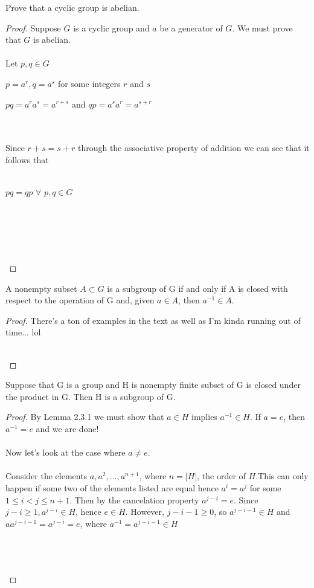 \documentclass[12pt]{article}
\newenvironment{lemma}[2][Lemma]{\begin{trivlist}
\item[\hskip \labelsep {\bfseries #1}\hskip \labelsep {\bfseries #2.}]}{\end{trivlist}}
\newenvironment{problem}[2][Problem]{\begin{trivlist}
\item[\hskip \labelsep {\bfseries #1}\hskip \labelsep {\bfseries #2.}]}{\end{trivlist}}
\begin{document}
\begin{problem}{2.3.12}
Prove that a cyclic group is abelian.
\end{problem}

\begin{proof}
Suppose $G$ is a cyclic group and $a$ be a generator of $G$. We must prove that $G$ is abelian. \\ \\
Let $p,q \in G$
\centerline{$p=a^r,q=a^s$ for some integers $r$ and $s$}
\centerline{$pq=a^ra^s=a^{r+s}$ and $qp=a^sa^r=a^{s+r}$} \\ \\
Since $r+s=s+r$ through the associative property of addition we can see that it follows that \\ \\ 
\centerline{$pq=qp$ $\forall$ $p,q \in G$} \\ \\
\centerline{} \\ \\
\end{proof}
 
 \begin{lemma}{2.3.1}
A nonempty subset $A \subset G$ is a subgroup of G if and only if A is closed with respect to the operation of G and, given $a \in A$, then $a^{-1} \in A$. 
\end{lemma}

\begin{proof}
There's a ton of examples in the text as well as I'm kinda running out of time... lol
\\ \\
\centerline{} 
\bigskip
\end{proof}

\begin{lemma}{2.3.2}
Suppose that G is a group and H is nonempty finite subset of G is closed under the product in G. Then H is a subgroup of G.
\end{lemma}

\begin{proof}
By Lemma 2.3.1 we must show that $a \in H$ implies $a^{-1}\in H$. If $a = e$, then $a^{-1} = e$ and we are done! \\ \\
Now let's look at the case where $a \neq e$. \\ \\
Consider the elements $a,a^2,...,a^{n+1}$, where $n = |H|$, the order of $H$.This can only happen if some two of the elements listed are equal hence $a^i = a^j$ for some $1 \leq i < j \leq n+1$. Then by the cancelation property $a^{j-i} = e$. Since $j-i \geq 1, a^{j-i} \in H$, hence $e \in H$. However, $j-i-1 \geq 0$, so $a^{j-i-1} \in H$ and $aa^{j-i-1} = a^{j-i} = e$, where $a^{-1} = a^{j-i-1} \in H$ \\ \\
\centerline{} \\ \\

\end{proof}



 
\end{document}
